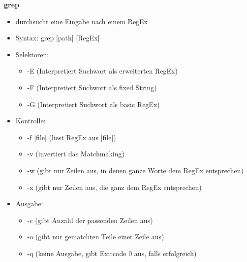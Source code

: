 \documentclass{article}
\begin{document}
\textbf{grep}
\begin{itemize}
	\item durchsucht eine Eingabe nach einem RegEx
	\item Syntax: grep [path] [RegEx]
	\item Selektoren:
	\begin{itemize}
		\item -E (Interpretiert Suchwort als erweiterten RegEx)
		\item -F (Interpretiert Suchwort als fixed String)
		\item -G (Interpretiert Suchwort als basic RegEx)
	\end{itemize}
	\item Kontrolle:
	\begin{itemize}
		\item -f [file] (liest RegEx aus [file])
		\item -v (invertiert das Matchmaking)
		\item -w (gibt nur Zeilen aus, in denen ganze Worte dem RegEx entsprechen)
		\item -x (gibt nur Zeilen aus, die ganz dem RegEx entsprechen)
	\end{itemize}
	\item Ausgabe:
	\begin{itemize}
		\item -c (gibt Anzahl der passenden Zeilen aus)
		\item -o (gibt nur gematchten Teile einer Zeile aus)
		\item -q (keine Ausgabe, gibt Exitcode 0 aus, falls erfolgreich)
	\end{itemize}
\end{itemize}
\end{document}
